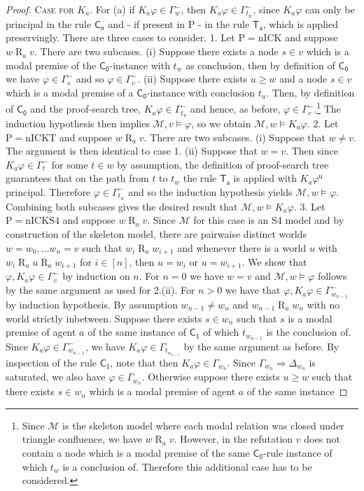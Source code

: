 \documentclass{myifcolog}
\newcommand{\K}{K}
\newcommand\Ck{\mathsf{C_0}}
\newcommand{\agi}{a}
\newcommand{\fw}{\mathcal{M}}
\newcommand{\Rel}{\mathrel{R}}
\renewcommand{\u}{\mathsf{u}}
\newcommand{\hickp}{\mathrm{P}}
\newcommand{\nick}{\mathrm{nICK}}
\newcommand{\nickt}{\mathrm{nICKT}}
\newcommand{\nicks}{\mathrm{nICKS4}}
\numberwithin{theorem}{section}
\begin{document}
\begin{proof}
\noindent \textsc{Case for $\K_\agi$.} For (a) if $\K_\agi\varphi\in \Gamma_w^-$, then $\K_\agi \varphi \in \Gamma_{t_w}^-$, since $\K_\agi \varphi$ can only be principal in the rule $\mathsf{C_n}$ and - if present in $\hickp$ - in the rule $\mathsf{T_\agi}$, which is applied preservingly. There are three cases to consider. 1. Let $\hickp = \nick$ and suppose $w \Rel_\agi v$. There are two subcases. (i) Suppose there exists a node $s \in v$ which is a modal premise of the $\mathsf{C_0}$-instance with $t_w$ as conclusion, then by definition of $\mathsf{C_0}$ we have $\varphi\in \Gamma_s^-$ and so $\varphi \in \Gamma_v^-$. (ii) Suppose there exists $u \geq w$ and a node $s \in v$ which is a modal premise of a $\mathsf{C_0}$-instance with conclusion $t_u$. Then, by definition of $\mathsf{C_0}$ and the proof-search tree, $\K_\agi \varphi \in \Gamma_{t_u}^-$ and hence, as before, $\varphi \in \Gamma_v^-$.\footnote{Since $\fw$ is the skeleton model where each modal relation was closed under triangle confluence, we have $w \Rel_\agi v$. However, in the refutation $v$ does not contain a node which is a modal premise of the same $\Ck$-rule instance of which $t_w$ is a conclusion of. Therefore this additional case has to be considered.} The induction hypothesis then implies  $\fw,v\models \varphi$, so we obtain $\fw,w\models \K_\agi\varphi$. 2. Let $\hickp = \nickt$ and suppose $w \Rel_\agi v$. There are two subcases. (i) Suppose that $w \not = v$. The argument is then identical to case 1. (ii) Suppose that $w = v$. Then since $\K_\agi \varphi \in \Gamma_t^-$ for some $t \in w$ by assumption, the definition of proof-search tree guarantees that on the path from $t$ to $t_w$ the rule $\mathsf{T_\agi}$ is applied with $\K_\agi \varphi^\u$ principal. Therefore $\varphi \in \Gamma_{t_w}^-$ and so the induction hypothesis yields $\fw, w \models \varphi$. Combining both subcases gives the desired result that $\fw, w \models \K_\agi \varphi$. 3. Let $\hickp = \nicks$ and suppose $w \Rel_\agi v$. Since $\fw$ for this case is an S4 model and by construction of the skeleton model, there are pairwaise distinct worlds $w= w_0, \ldots w_n = v$ such that $w_i \Rel_\agi w_{i+1}$ and whenever there is a world $u$ with $w_i \Rel_\agi u \Rel_\agi w_{i+1}$ for $i \in [n]$, then $u = w_i$ or $u= w_{i+1}$. We show that $\varphi, \K_\agi \varphi \in \Gamma_v^-$ by induction on $n$. For $n=0$ we have $w = v$ and $\fw, w \models \varphi$ follows by the same argument as used for 2.(ii). For $n>0$ we have that $\varphi, \K_\agi \varphi \in \Gamma_{w_{n-1}}^-$ by induction hypothesis. By assumption $w_{n-1} \not = w_n$ and $w_{n-1} \Rel_\agi w_n$ with no world strictly inbetween. Suppose there exists $s \in w_n$ such that $s$ is a modal premise of agent $\agi$ of the same instance of $\mathsf{C_1}$ of which $t_{w_{n-1}}$ is the conclusion of. Since $\K_\agi \varphi \in \Gamma_{w_{n-1}}^-$, we have $\K_\agi \varphi \in \Gamma_{t_{w_{n-1}}}$ by the same argument as before. By inspection of the rule $\mathsf{C_1}$, note that then $\K_\agi \varphi \in \Gamma_{w_n}$. Since $\Gamma_{w_n} \Rightarrow \Delta_{w_n}$ is saturated, we also have $\varphi \in \Gamma_{w_n}$. Otherwise suppose there exists $u \geq w$ such that there exists $s \in w_n$ which is a modal premise of agent $\agi$ of the same instance 
\end{proof}
\end{document}
